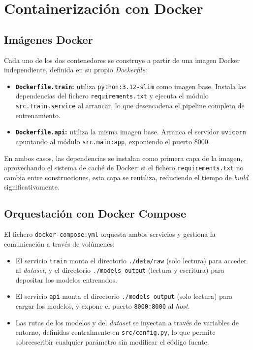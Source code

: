 \section{Containerización con Docker}
\label{sec:docker}

\subsection{Imágenes Docker}
\label{subsec:imagenes_docker}

Cada uno de los dos contenedores se construye a partir de una imagen Docker independiente, definida en su propio \textit{Dockerfile}:

\begin{itemize}
    \item \textbf{\texttt{Dockerfile.train}:} utiliza \texttt{python:3.12-slim} como imagen base. Instala las dependencias del fichero \texttt{requirements.txt} y ejecuta el módulo \texttt{src.train.service} al arrancar, lo que desencadena el pipeline completo de entrenamiento.
    \item \textbf{\texttt{Dockerfile.api}:} utiliza la misma imagen base. Arranca el servidor \texttt{uvicorn} apuntando al módulo \texttt{src.main:app}, exponiendo el puerto 8000.
\end{itemize}

En ambos casos, las dependencias se instalan como primera capa de la imagen, aprovechando el sistema de caché de Docker: si el fichero \texttt{requirements.txt} no cambia entre construcciones, esta capa se reutiliza, reduciendo el tiempo de \textit{build} significativamente.

\subsection{Orquestación con Docker Compose}
\label{subsec:docker_compose}

El fichero \texttt{docker-compose.yml} orquesta ambos servicios y gestiona la comunicación a través de volúmenes:

\begin{itemize}
    \item El servicio \texttt{train} monta el directorio \texttt{./data/raw} (solo lectura) para acceder al \textit{dataset}, y el directorio \texttt{./models\_output} (lectura y escritura) para depositar los modelos entrenados.
    \item El servicio \texttt{api} monta el directorio \texttt{./models\_output} (solo lectura) para cargar los modelos, y expone el puerto \texttt{8000:8000} al \textit{host}.
    \item Las rutas de los modelos y del \textit{dataset} se inyectan a través de variables de entorno, definidas centralmente en \texttt{src/config.py}, lo que permite sobreescribir cualquier parámetro sin modificar el código fuente.
\end{itemize}

